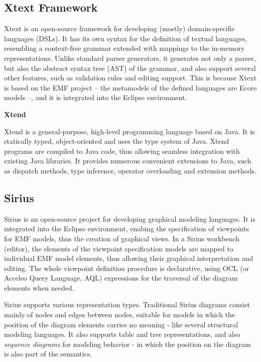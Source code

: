 \subsection{Xtext Framework} \label{subsec_xtext}
Xtext is an open-source framework for developing (mostly) domain-specific languages (DSLs). It has its own syntax for the definition of textual languages, resembling a context-free grammar extended with mappings to the in-memory representations. Unlike standard parser generators, it generates not only a parser, but also the abstract syntax tree (AST) of the grammar, and also support several other features, such as validation rules and editing support. This is because Xtext is based on the EMF project -- the metamodels of the defined languages are Ecore models --, and it is integrated into the Eclipse environment.

\textbf{Xtend}

Xtend is a general-purpose, high-level programming language based on Java. It is statically typed, object-oriented and uses the type system of Java. Xtend programs are compiled to Java code, thus allowing seamless integration with existing Java libraries. It provides numerous convenient extensions to Java, such as dispatch methods, type inference, operator overloading and extension methods.

\subsection{Sirius} \label{subsec_sirius}
Sirius is an open-source project for developing graphical modeling languages. It is integrated into the Eclipse environment, enabing the specification of viewpoints for EMF models, thus the creation of graphical views. In a Sirius workbench (editor), the elements of the viewpoint specification models are mapped to individual EMF model elements, thus allowing their graphical interpretation and editing. The whole viewpoint definition procedure is declarative, using OCL \cite{OCLStandard} (or Acceleo Query Language, AQL) expressions for the traversal of the diagram elements when needed.

Sirius supports various representation types. Traditional Sirius diagrams consist mainly of nodes and edges between nodes, suitable for models in which the position of the diagram elements carries no meaning - like several structural modeling languages. It also supports table and tree representations, and also \textit{sequence diagrams} for modeling behavior - in which the position on the diagram is also part of the semantics.


